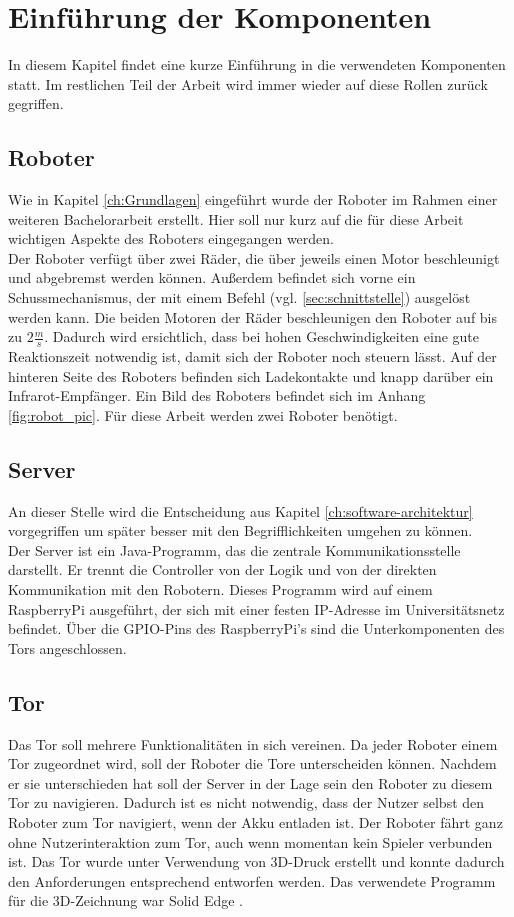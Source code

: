 \chapter{Einführung der Komponenten}

In diesem Kapitel findet eine kurze Einführung in die verwendeten Komponenten statt. Im restlichen Teil der Arbeit wird immer wieder auf diese Rollen zurück gegriffen.

\section{Roboter}
Wie in Kapitel \ref{ch:Grundlagen} eingeführt wurde der Roboter im Rahmen einer weiteren Bachelorarbeit erstellt. Hier soll nur kurz auf die für diese Arbeit wichtigen Aspekte des Roboters eingegangen werden. \\
Der Roboter verfügt über zwei Räder, die über jeweils einen Motor beschleunigt und abgebremst werden können. Außerdem befindet sich vorne ein Schussmechanismus, der mit einem Befehl (vgl. \ref{sec:schnittstelle}) ausgelöst werden kann. Die beiden Motoren der Räder beschleunigen den Roboter auf bis zu $2\frac{m}{s}$. Dadurch wird ersichtlich, dass bei hohen Geschwindigkeiten eine gute Reaktionszeit notwendig ist, damit sich der Roboter noch steuern lässt. Auf der hinteren Seite des Roboters befinden sich Ladekontakte und knapp darüber ein Infrarot-Empfänger. Ein Bild des Roboters befindet sich im Anhang \ref{fig:robot_pic}. Für diese Arbeit werden zwei Roboter benötigt.

\section{Server}
An dieser Stelle wird die Entscheidung aus Kapitel \ref{ch:software-architektur} vorgegriffen um später besser mit den Begrifflichkeiten umgehen zu können. \\
Der Server ist ein Java-Programm, das die zentrale Kommunikationsstelle darstellt. Er trennt die Controller von der Logik und von der direkten Kommunikation mit den Robotern. Dieses Programm wird auf einem RaspberryPi ausgeführt, der sich mit einer festen IP-Adresse im Universitätsnetz befindet. Über die GPIO-Pins des RaspberryPi's sind die Unterkomponenten des Tors angeschlossen.

\section{Tor}
Das Tor soll mehrere Funktionalitäten in sich vereinen. Da jeder Roboter einem Tor zugeordnet wird, soll der Roboter die Tore unterscheiden können. Nachdem er sie unterschieden hat soll der Server in der Lage sein den Roboter zu diesem Tor zu navigieren. Dadurch ist es nicht notwendig, dass der Nutzer selbst den Roboter zum Tor navigiert, wenn der Akku entladen ist. Der Roboter fährt ganz ohne Nutzerinteraktion zum Tor, auch wenn momentan kein Spieler verbunden ist. Das Tor wurde unter Verwendung von 3D-Druck erstellt und konnte dadurch den Anforderungen entsprechend entworfen werden. Das verwendete Programm für die 3D-Zeichnung war Solid Edge \cite{SOLIDEDGE}.

